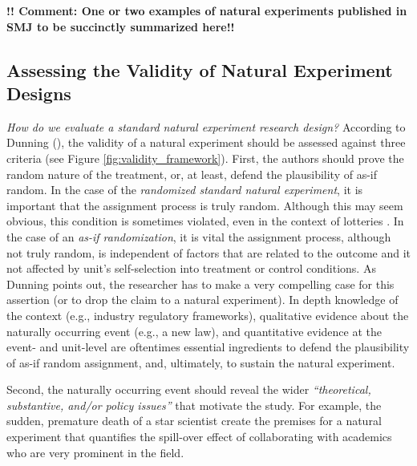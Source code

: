 \documentclass[nobib]{tufte-handout}
\begin{document}
\begin{refsection}
\noindent \textbf{!! Comment: One or two examples of natural experiments
published in SMJ to be succinctly summarized here!!}

\subsection{Assessing the Validity of Natural Experiment Designs}
\label{sub:validity_framework}

\noindent\emph{How do we evaluate a standard natural experiment research
design?} According to Dunning (\cite*[][page 27]{Dunning2012}), the validity of
a natural experiment should be assessed against three criteria (see Figure
\ref{fig:validity_framework}).  First, the authors should prove the random
nature of the treatment, or, at least, defend the plausibility of as-if random.
In the case of the \emph{randomized standard natural experiment}, it is
important that the assignment process is truly random. Although this may seem
obvious, this condition is sometimes violated, even in the context of lotteries
\parencite[e.g.][]{Starr1997}. In the case of an \emph{as-if randomization}, it
is vital the assignment process, although not truly random, is independent of
factors that are related to the outcome and it not affected by unit's
self-selection into treatment or control conditions. As Dunning points out, the
researcher has to make a very compelling case for this assertion (or to drop the
claim to a natural experiment). In depth knowledge of the context (e.g.,
industry regulatory frameworks), qualitative evidence about the naturally
occurring event (e.g., a new law), and quantitative evidence at the event- and
unit-level are oftentimes essential ingredients to defend the plausibility of
as-if random assignment, and, ultimately, to sustain the natural experiment.

Second, the naturally occurring event should reveal the wider
\emph{``theoretical, substantive, and/or policy issues''} \parencite[][page
29]{Dunning2012} that motivate the study. For example, the sudden, premature
death of a star scientist \parencite[][]{Azoulay2010} create the premises for a
natural experiment that quantifies the spill-over effect of collaborating with
academics who are very prominent in the field.


\end{refsection}
\end{document}
